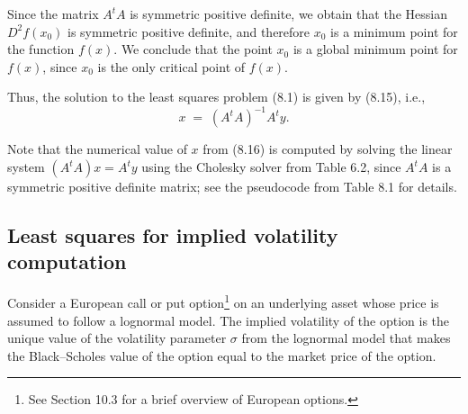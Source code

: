 
Since the matrix $A^tA$ is symmetric positive definite, we obtain that the Hessian
$D^2f(x_0)$ is symmetric positive definite, and therefore $x_0$ is a minimum point for
the function $f(x)$. We conclude that the point $x_0$ is a global minimum point for
$f(x)$, since $x_0$ is the only critical point of $f(x)$.

Thus, the solution to the least squares problem (8.1) is given by (8.15), i.e.,
\begin{equation}
x \;=\; (A^tA)^{-1}A^ty.
\end{equation}

Note that the numerical value of $x$ from (8.16) is computed by solving the linear
system $(A^tA)x = A^ty$ using the Cholesky solver from Table 6.2, since $A^tA$ is a
symmetric positive definite matrix; see the pseudocode from Table 8.1 for details.

\begin{table}[H]
\centering
\caption{Least squares implementation}
\end{table}

\subsection{Least squares for implied volatility computation}

Consider a European call or put option\footnote{See Section 10.3 for a brief overview
of European options.} on an underlying asset whose price is assumed to follow a
lognormal model. The implied volatility of the option is the unique value of the
volatility parameter $\sigma$ from the lognormal model that makes the Black--Scholes
value of the option equal to the market price of the option.

